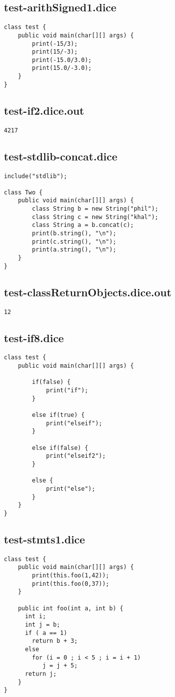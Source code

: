 \subsection{test-arithSigned1.dice}
\begin{verbatim}
class test {
	public void main(char[][] args) {
		print(-15/3);
		print(15/-3);
		print(-15.0/3.0);
		print(15.0/-3.0);
	}
}
\end{verbatim}
\pagebreak
\subsection{test-if2.dice.out}
\begin{verbatim}
4217
\end{verbatim}
\pagebreak
\subsection{test-stdlib-concat.dice}
\begin{verbatim}
include("stdlib");

class Two {
	public void main(char[][] args) {
        class String b = new String("phil");
        class String c = new String("khal");
        class String a = b.concat(c);
        print(b.string(), "\n");
        print(c.string(), "\n");
        print(a.string(), "\n");
	}
}

\end{verbatim}
\pagebreak
\subsection{test-classReturnObjects.dice.out}
\begin{verbatim}
12
\end{verbatim}
\pagebreak
\subsection{test-if8.dice}
\begin{verbatim}
class test {
	public void main(char[][] args) {

		if(false) { 
			print("if");
		} 
		
		else if(true) { 
			print("elseif"); 
		}

		else if(false) {
			print("elseif2");
		}

		else {
			print("else");
		}
	}
}
\end{verbatim}
\pagebreak
\subsection{test-stmts1.dice}
\begin{verbatim}
class test {
	public void main(char[][] args) {
		print(this.foo(1,42));
	 	print(this.foo(0,37));
	}

	public int foo(int a, int b) {
	  int i;
	  int j = b;
	  if ( a == 1)
	    return b + 3;
	  else
	    for (i = 0 ; i < 5 ; i = i + 1)
	       j = j + 5;
	  return j;  
	}  
}
\end{verbatim}
\pagebreak
